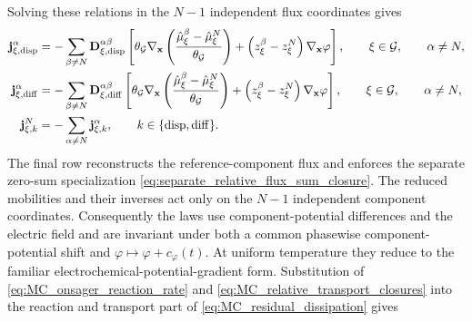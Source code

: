 Solving these relations in the \(N-1\) independent flux coordinates gives
%
\begin{align}
	\mathbf{j}_{\xi,{\rm disp}}^\alpha
	 & =-\sum_{\beta\ne N}
	\mathbf{D}_{\xi,{\rm disp}}^{\alpha\beta}
	\left[
		\theta_{\mathcal{G}}
		\nabla_{\mathbf{x}}
		\left(
			\frac{
				\hat\mu_\xi^\beta-\hat\mu_\xi^N
			}{\theta_{\mathcal{G}}}
		\right)
		+
		\left(
			z_\xi^\beta-z_\xi^N
		\right)
		\nabla_{\mathbf{x}}\varphi
	\right],
	\qquad
	\xi\in\mathcal{G},
	\qquad
	\alpha\ne N,
	\label{eq:MC_dispersion_closure}
	\\
	\mathbf{j}_{\xi,{\rm diff}}^\alpha
	 & =-\sum_{\beta\ne N}
	\mathbf{D}_{\xi,{\rm diff}}^{\alpha\beta}
	\left[
		\theta_{\mathcal{G}}
		\nabla_{\mathbf{x}}
		\left(
			\frac{
				\hat\mu_\xi^\beta-\hat\mu_\xi^N
			}{\theta_{\mathcal{G}}}
		\right)
		+
		\left(
			z_\xi^\beta-z_\xi^N
		\right)
		\nabla_{\mathbf{x}}\varphi
	\right],
	\qquad
	\xi\in\mathcal{G},
	\qquad
	\alpha\ne N,
	\label{eq:MC_diffusion_closure}
	\\
	\mathbf{j}_{\xi,k}^N
	 & =
	-\sum_{\alpha\ne N}\mathbf{j}_{\xi,k}^\alpha,
	\qquad
	k\in\{{\rm disp},{\rm diff}\}.
	\label{eq:MC_relative_transport_closures}
\end{align}
%
The final row reconstructs the reference-component flux and enforces the
separate zero-sum specialization
\eqref{eq:separate_relative_flux_sum_closure}.  The reduced mobilities and
their inverses act only on the \(N-1\) independent component coordinates.
Consequently the laws use component-potential differences and the electric field
and are invariant under both a common phasewise component-potential shift and
\(\varphi\mapsto\varphi+c_\varphi(t)\).  At uniform temperature they reduce to
the familiar electrochemical-potential-gradient form.
Substitution of
\eqref{eq:MC_onsager_reaction_rate} and
\eqref{eq:MC_relative_transport_closures} into the reaction and transport part
of \eqref{eq:MC_residual_dissipation} gives
%
